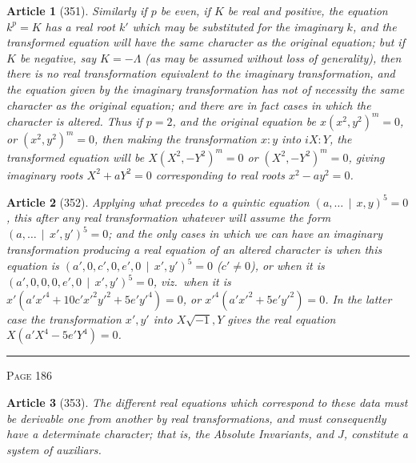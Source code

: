 \documentclass[11pt,a4paper]{article}
\theoremstyle{cayley}
\newtheorem{art}{Article}
\begin{document}
\begin{art}[351]
Similarly if $p$ be even, if $K$ be real and positive, the equation $k^p = K$ has a real root $k'$ which may be substituted for the imaginary $k$, and the transformed equation will have the same character as the original equation; but if $K$ be negative, say $K = -\Lambda$ (as may be assumed without loss of generality), then there is no real transformation equivalent to the imaginary transformation, and the equation given by the imaginary transformation has not of necessity the same character as the original equation; and there are in fact cases in which the character is altered. Thus if $p=2$, and the original equation be $x(x^2, y^2)^m = 0$, or $(x^2, y^2)^m = 0$, then making the transformation $x:y$ into $iX:Y$, the transformed equation will be $X(X^2, -Y^2)^m = 0$ or $(X^2, -Y^2)^m = 0$, giving imaginary roots $X^2 + aY^2 = 0$ corresponding to real roots $x^2 - ay^2 = 0$.
\end{art}

\begin{art}[352]
Applying what precedes to a quintic equation $(a, \ldots \,\mid\, x, y)^5 = 0$, this after any real transformation whatever will assume the form $(a, \ldots \,\mid\, x', y')^5 = 0$; and the only cases in which we can have an imaginary transformation producing a real equation of an altered character is when this equation is $(a', 0, c', 0, e', 0 \,\mid\, x', y')^5 = 0$ ($c' \neq 0$), or when it is $(a', 0, 0, 0, e', 0 \,\mid\, x', y')^5 = 0$, viz.\ when it is $x'(a'x'^4 + 10c'x'^2y'^2 + 5e'y'^4) = 0$, or $x'^4(a'x'^2 + 5e'y'^2) = 0$. In the latter case the transformation $x', y'$ into $X\sqrt{-1}, Y$ gives the real equation $X(a'X^4 - 5e'Y^4) = 0$.
\end{art}

\vspace{1em}
\noindent\rule{\textwidth}{0.4pt}
\begin{center}\textsc{Page 186}\end{center}
\newpage

\begin{art}[353]
The different real equations which correspond to these data must be derivable one from another by real transformations, and must consequently have a determinate character; that is, the Absolute Invariants, and $J$, constitute a system of auxiliars.
\end{art}
\end{document}
